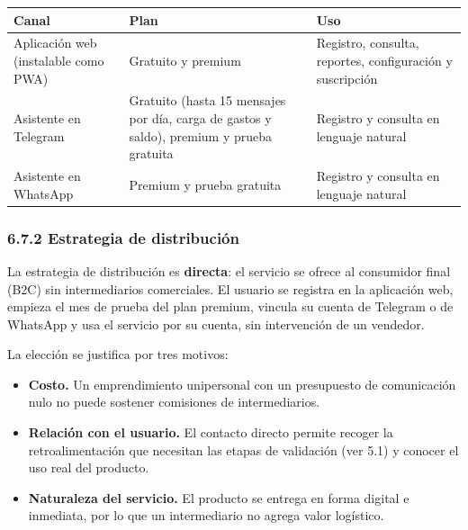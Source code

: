 {\def\LTcaptype{none} %
\begin{longtable}[]{@{}
  >{\raggedright\arraybackslash}p{}
  >{\raggedright\arraybackslash}p{}
  >{\raggedright\arraybackslash}p{}@{}}
\toprule\noalign{}
\begin{minipage}[b]{\linewidth}\raggedright
Canal
\end{minipage} & \begin{minipage}[b]{\linewidth}\raggedright
Plan
\end{minipage} & \begin{minipage}[b]{\linewidth}\raggedright
Uso
\end{minipage} \\
\midrule\noalign{}
\endhead
\bottomrule\noalign{}
\endlastfoot
Aplicación web (instalable como PWA) & Gratuito y premium & Registro,
consulta, reportes, configuración y suscripción \\
Asistente en Telegram & Gratuito (hasta 15 mensajes por día, carga de
gastos y saldo), premium y prueba gratuita & Registro y consulta en
lenguaje natural \\
Asistente en WhatsApp & Premium y prueba gratuita & Registro y consulta
en lenguaje natural \\
\end{longtable}
}

\subsubsection*{6.7.2 Estrategia de
distribución}\label{estrategia-de-distribuciuxf3n}

La estrategia de distribución es \textbf{directa}: el servicio se ofrece
al consumidor final (B2C) sin intermediarios comerciales. El usuario se
registra en la aplicación web, empieza el mes de prueba del plan
premium, vincula su cuenta de Telegram o de WhatsApp y usa el servicio
por su cuenta, sin intervención de un vendedor.

La elección se justifica por tres motivos:

\begin{itemize}
\tightlist
\item
  \textbf{Costo.} Un emprendimiento unipersonal con un presupuesto de
  comunicación nulo no puede sostener comisiones de intermediarios.
\item
  \textbf{Relación con el usuario.} El contacto directo permite recoger
  la retroalimentación que necesitan las etapas de validación (ver 5.1)
  y conocer el uso real del producto.
\item
  \textbf{Naturaleza del servicio.} El producto se entrega en forma
  digital e inmediata, por lo que un intermediario no agrega valor
  logístico.
\end{itemize}

